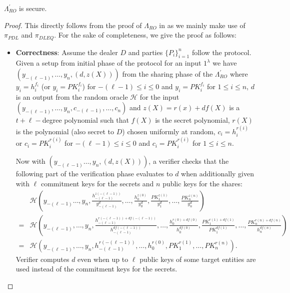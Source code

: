 \begin{theorem}
  $\Lambda_{RO}^{'}$ is secure.
\end{theorem}
\begin{proof}
  This directly follows from the proof of $\Lambda_{RO}$ in \cite{cryptoeprint:2025/576} as we mainly make use of 
  $\pi_{PDL}$ and $\pi_{DLEQ}$. For the sake of completeness, we give the proof as follows: 
  \begin{itemize}
    \item \textbf{Correctness}: Assume the dealer $D$ and parties $\{P_i\}_{i=1}^n$ follow the protocol. Given a 
    setup from initial phase of the protocol for an input $1^\lambda$ we have $(y_{-(\ell-1)},\dots,y_n,(d,z(X)))$ from 
    the sharing phase of the $\Lambda_{RO}^{'}$ where 
    $y_i=h_i^{f_i}$ (or $y_i=PK_i^{f_i}$) for $-(\ell-1)\leq i\leq 0$ and $y_i=PK_i^{f_i}$ for $1\leq i\leq n$, 
    $d$ is an output 
    from the random oracle $\mathcal{H}$ for the input $(y_{-(\ell-1)},\dots,y_n,c_{-(\ell-1)},\dots,c_n)$ and $z(X)=r(x)+df(X)$ 
    is a $t+\ell-$degree polynomial such that $f(X)$ is the secret polynomial, $r(X)$ is the polynomial (also secret to $D$) 
    chosen uniformly at random, $c_i=h_i^{r(i)}$ or $c_i=PK_i^{r(i)}$ for $-(\ell-1)\leq i\leq 0$ and 
    $c_i=PK_i^{r(i)}$ for $1\leq i\leq n$.\par 

    Now with $(y_{-(\ell-1)}\dots,y_n,(d,z(X)))$, a verifier checks that the following part of the verification phase evaluates to $d$ 
    when additionally given with $\ell$ commitment keys for the secrets and $n$ public keys for the shares:
    \begin{align*}
      &\mathcal{H}(y_{-(\ell-1)}\dots,y_n,\frac{h_{-(\ell-1)}^{z(-(\ell-1))}}{y_{-(\ell-1)}^d},\dots,\frac{h_0^{z(0)}}{y_0^d},\frac{PK_1^{z(1)}}{y_1^d},\dots,\frac{PK_n^{z(n)}}{y_n^d})\\
      =&\mathcal{H}(y_{-(\ell-1)},\dots,y_n,\frac{h_{-(\ell-1)}^{r(-(\ell-1))+df(-(\ell-1))}}{h_{-(\ell-1)}^{df(-(\ell-1))}},\dots,\frac{h_0^{r(0)+df(0)}}{h_0^{df(0)}},\frac{PK_1^{r(1)+df(1)}}{PK_1^{df(1)}},\dots,\frac{PK_n^{r(n)+df(n)}}{h_n^{df(n)}})\\
      =&\mathcal{H}(y_{-(\ell-1)},\dots,y_n,h_{-(\ell-1)}^{r(-(\ell-1))},\dots,h_0^{r(0)},PK_1^{r(1)},\dots,PK_n^{r(n)}).
    \end{align*}
    Verifier computes $d$ even when up to $\ell$ public keys of some target entities are used instead of the commitment 
    keys for the secrets.\par 
    

\end{itemize}
\end{proof}
